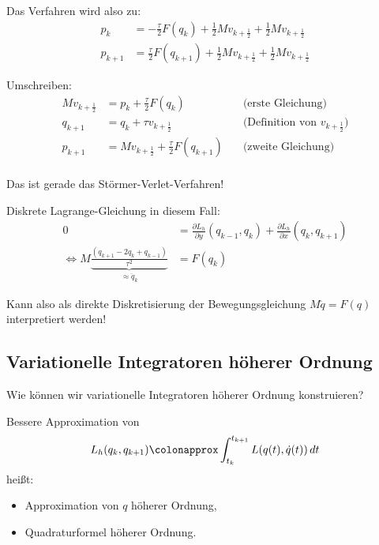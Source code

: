 Das Verfahren wird also zu:
\begin{align*}
p_k & = - \frac{\tau}{2} F(q_k) + \frac{1}{2} Mv_{k+\frac{1}{2}}  + \frac{1}{2} Mv_{k+\frac{1}{2}} \\
p_{k + 1} & =  \frac{\tau}{2} F(q_{k+1}) + \frac{1}{2} Mv_{k+\frac{1}{2}}  + \frac{1}{2} Mv_{k+\frac{1}{2}}
\end{align*}

Umschreiben:
\begin{align*}
Mv_{k+\frac{1}{2}} & = p_k + \frac{\tau}{2} F(q_k) &\quad\text{(erste Gleichung)}\\
q_{k + 1} & = q_k + \tau v_{k+\frac{1}{2}} &\quad\text{(Definition von $v_{k+ \frac{1}{2}}$)}\\
p_{k + 1} & = Mv_{k+\frac{1}{2}}  + \frac{\tau}{2} F(q_{k+1}) &\quad\text{(zweite Gleichung)}\\
\end{align*}

Das ist gerade das Störmer-Verlet-Verfahren!

\medskip

Diskrete Lagrange-Gleichung in diesem Fall:
\begin{align*}
0 & =  \frac{\partial L_h}{\partial y} (q_{k-1}, q_k) + \frac{\partial L_h}{\partial x} (q_k, q_{k+1}) \\
\Leftrightarrow M\underbrace{\frac{(q_{k+1} - 2q_k + q_{k-1})}{\tau^2}}_{\approx \ddot{q}_k} & = F(q_k)
\end{align*}

Kann also als direkte Diskretisierung der Bewegungsgleichung $M \ddot{q} = F(q)$ interpretiert werden!

\subsection{Variationelle Integratoren höherer Ordnung}

Wie können wir variationelle Integratoren höherer Ordnung konstruieren?

\bigskip

Bessere Approximation von
\begin{equation*}
 L_h (q_k, q_{k+1})
 \colonapprox
 \int_{t_k}^{t_{k+1}} L(q(t),\dot{q}(t))\,dt
\end{equation*}
heißt:
\begin{itemize}
 \item Approximation von $q$ höherer Ordnung,
 \item Quadraturformel höherer Ordnung.
\end{itemize}

